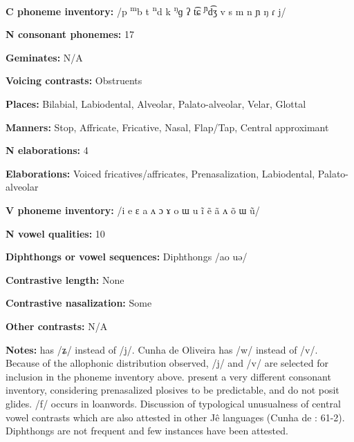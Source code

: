 \textbf{C phoneme inventory:} /p \textsuperscript{m}b t \textsuperscript{n}d k \textsuperscript{ŋ}ɡ ʔ t͡ɕ \textsuperscript{ɲ}d͡ʒ v s m n ɲ ŋ ɾ j/



\textbf{N consonant phonemes:} 17



\textbf{Geminates:} N/A



\textbf{Voicing contrasts:} Obstruents



\textbf{Places:} Bilabial, Labiodental, Alveolar, Palato-alveolar, Velar, Glottal



\textbf{Manners:} Stop, Affricate, Fricative, Nasal, Flap/Tap, Central approximant



\textbf{N elaborations:} 4



\textbf{Elaborations:} Voiced fricatives/affricates, Prenasalization, Labiodental, Palato-alveolar



\textbf{V phoneme inventory:} /i e ɛ a ʌ ɔ ɤ o ɯ u ĩ ẽ ã ʌ õ ɯ ũ/



\textbf{N vowel qualities:} 10



\textbf{Diphthongs or vowel sequences:} Diphthongs /ao uə/



\textbf{Contrastive length:} None



\textbf{Contrastive nasalization:} Some



\textbf{Other contrasts:} N/A



\textbf{Notes:} \citet{Ham2009} has /ʑ/ instead of /j/. Cunha de Oliveira has /w/ instead of /v/. Because of the allophonic distribution observed, /j/ and /v/ are selected for inclusion in the phoneme inventory above. \citet{BurgessHam1968} present a very different consonant inventory, considering prenasalized plosives to be predictable, and do not posit glides. /f/ occurs in loanwords. Discussion of typological unusualness of central vowel contrasts which are also attested in other Jê languages (Cunha de \citealt{Oliveira2005}: 61-2). Diphthongs are not frequent and few instances have been attested.



